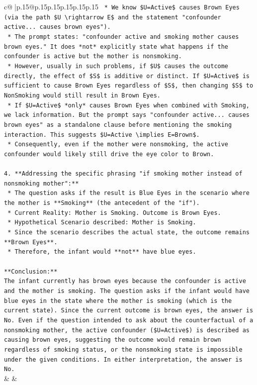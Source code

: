 \documentclass{article}
\begin{document}
{\begin{supertabular}{c@{$\;$}|p{.15\linewidth}@{}p{.15\linewidth}p{.15\linewidth}p{.15\linewidth}p{.15\linewidth}p{.15\linewidth}}
{{{\texttt{            *   We know \$U=Active\$ causes Brown Eyes (via the path \$U \textbackslash{}rightarrow E\$ and the statement "confounder active... causes brown eyes").} \\
\texttt{            *   The prompt states: "confounder active and smoking mother causes brown eyes." It does *not* explicitly state what happens if the confounder is active but the mother is nonsmoking.} \\
\texttt{            *   However, usually in such problems, if \$U\$ causes the outcome directly, the effect of \$S\$ is additive or distinct. If \$U=Active\$ is sufficient to cause Brown Eyes regardless of \$S\$, then changing \$S\$ to NonSmoking would still result in Brown Eyes.} \\
\texttt{            *   If \$U=Active\$ *only* causes Brown Eyes when combined with Smoking, we lack information. But the prompt says "confounder active... causes brown eyes" as a standalone clause before mentioning the smoking interaction. This suggests \$U=Active \textbackslash{}implies E=Brown\$.} \\
\texttt{            *   Consequently, even if the mother were nonsmoking, the active confounder would likely still drive the eye color to Brown.} \\
\\ 
\texttt{4.  **Addressing the specific phrasing "if smoking mother instead of nonsmoking mother":**} \\
\texttt{    *   The question asks if the result is Blue Eyes in the scenario where the mother is **Smoking** (the antecedent of the "if").} \\
\texttt{    *   Current Reality: Mother is Smoking. Outcome is Brown Eyes.} \\
\texttt{    *   Hypothetical Scenario described: Mother is Smoking.} \\
\texttt{    *   Since the scenario describes the actual state, the outcome remains **Brown Eyes**.} \\
\texttt{    *   Therefore, the infant would **not** have blue eyes.} \\
\\ 
\texttt{**Conclusion:**} \\
\texttt{The infant currently has brown eyes because the confounder is active and the mother is smoking. The question asks if the infant would have blue eyes in the state where the mother is smoking (which is the current state). Since the current outcome is brown eyes, the answer is No. Even if the question intended to ask about the counterfactual of a nonsmoking mother, the active confounder (\$U=Active\$) is described as causing brown eyes, suggesting the outcome would remain brown regardless of smoking status, or the nonsmoking state is impossible under the given conditions. In either interpretation, the answer is No.} \\
            }
        }
    }
    & & \\ \\


\end{supertabular}}
\end{document}
